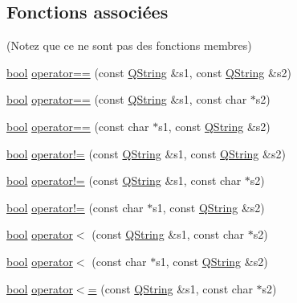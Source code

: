 \subsection*{Fonctions associées}
(Notez que ce ne sont pas des fonctions membres) \begin{DoxyCompactItemize}
\item 
\hyperlink{qglobal_8h_a1062901a7428fdd9c7f180f5e01ea056}{bool} \hyperlink{class_q_string_acdeb7d77a324fe69b0e5889ff8575400}{operator==} (const \hyperlink{class_q_string}{Q\+String} \&s1, const \hyperlink{class_q_string}{Q\+String} \&s2)
\item 
\hyperlink{qglobal_8h_a1062901a7428fdd9c7f180f5e01ea056}{bool} \hyperlink{class_q_string_af35a5ca71a731a8ecf66c62a74123be2}{operator==} (const \hyperlink{class_q_string}{Q\+String} \&s1, const char $\ast$s2)
\item 
\hyperlink{qglobal_8h_a1062901a7428fdd9c7f180f5e01ea056}{bool} \hyperlink{class_q_string_af13dfeb5517343bb511393c74f18a3b6}{operator==} (const char $\ast$s1, const \hyperlink{class_q_string}{Q\+String} \&s2)
\item 
\hyperlink{qglobal_8h_a1062901a7428fdd9c7f180f5e01ea056}{bool} \hyperlink{class_q_string_aaeae05f02ef07005a07ac285706920dd}{operator!=} (const \hyperlink{class_q_string}{Q\+String} \&s1, const \hyperlink{class_q_string}{Q\+String} \&s2)
\item 
\hyperlink{qglobal_8h_a1062901a7428fdd9c7f180f5e01ea056}{bool} \hyperlink{class_q_string_a77e694c60b1699442a3f13e8bbc0c4a9}{operator!=} (const \hyperlink{class_q_string}{Q\+String} \&s1, const char $\ast$s2)
\item 
\hyperlink{qglobal_8h_a1062901a7428fdd9c7f180f5e01ea056}{bool} \hyperlink{class_q_string_aba83e5b91872eeb6af5f55d7b96ab50b}{operator!=} (const char $\ast$s1, const \hyperlink{class_q_string}{Q\+String} \&s2)
\item 
\hyperlink{qglobal_8h_a1062901a7428fdd9c7f180f5e01ea056}{bool} \hyperlink{class_q_string_abe479c7e9bb723be856c1bcc388fb50f}{operator$<$} (const \hyperlink{class_q_string}{Q\+String} \&s1, const char $\ast$s2)
\item 
\hyperlink{qglobal_8h_a1062901a7428fdd9c7f180f5e01ea056}{bool} \hyperlink{class_q_string_ad25d50b4f92864191c30a5a76e7894b8}{operator$<$} (const char $\ast$s1, const \hyperlink{class_q_string}{Q\+String} \&s2)
\item 
\hyperlink{qglobal_8h_a1062901a7428fdd9c7f180f5e01ea056}{bool} \hyperlink{class_q_string_a12eb758cb95c371ba27ef75d82c2ec86}{operator$<$=} (const \hyperlink{class_q_string}{Q\+String} \&s1, const char $\ast$s2)

\end{DoxyCompactItemize}
